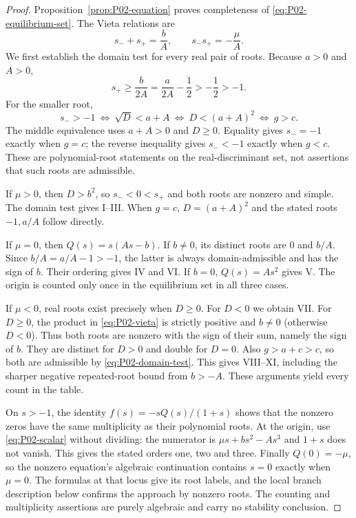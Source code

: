 \begin{proof}
Proposition~\ref{prop:P02-equation} proves completeness of
\eqref{eq:P02-equilibrium-set}. The Vieta relations are
\begin{equation}
\label{eq:P02-vieta}
 s_-+s_+=\frac bA,\qquad s_-s_+=-\frac\mu A.
\end{equation}
We first establish the domain test for every real pair of roots.
Because $a>0$ and $A>0$,
\[
 s_+\ge\frac b{2A}=\frac a{2A}-\frac12>-\frac12>-1.
\]
For the smaller root,
\begin{equation}
\label{eq:P02-domain-test}
 s_->-1
 \ \Longleftrightarrow\ \sqrt D<a+A
 \ \Longleftrightarrow\ D<(a+A)^2
 \ \Longleftrightarrow\ g>c.
\end{equation}
The middle equivalence uses $a+A>0$ and $D\ge0$. Equality gives
$s_-=-1$ exactly when $g=c$; the reverse inequality gives $s_-<-1$
exactly when $g<c$. These are polynomial-root statements on the
real-discriminant set, not assertions that such roots are admissible.

If $\mu>0$, then $D>b^2$, so $s_-<0<s_+$ and both roots are
nonzero and simple. The domain test gives I--III. When $g=c$,
$D=(a+A)^2$ and the stated roots $-1,a/A$ follow directly.

If $\mu=0$, then $Q(s)=s(As-b)$. If $b\ne0$, its distinct roots
are $0$ and $b/A$. Since $b/A=a/A-1>-1$, the latter is always
domain-admissible and has the sign of $b$. Their ordering gives
IV and VI. If $b=0$, $Q(s)=As^2$ gives V. The origin is counted
only once in the equilibrium set in all three cases.

If $\mu<0$, real roots exist precisely when $D\ge0$. For $D<0$
we obtain VII. For $D\ge0$, the product in \eqref{eq:P02-vieta}
is strictly positive and $b\ne0$ (otherwise $D<0$). Thus both
roots are nonzero with the sign of their sum, namely the sign of $b$.
They are distinct for $D>0$ and double for $D=0$. Also
$g>a+c>c$, so both are admissible by \eqref{eq:P02-domain-test}.
This gives VIII--XI, including the sharper negative repeated-root
bound from $b>-A$. These arguments yield every count in the table.

On $s>-1$, the identity $f(s)=-sQ(s)/(1+s)$ shows that the
nonzero zeros have the same multiplicity as their polynomial roots.
At the origin, use \eqref{eq:P02-scalar} without dividing:
the numerator is $\mu s+bs^2-As^3$ and $1+s$ does not vanish.
This gives the stated orders one, two and three. Finally $Q(0)=-\mu$,
so the nonzero equation's algebraic continuation contains $s=0$
exactly when $\mu=0$. The formulas at that locus give its root
labels, and the local branch description below confirms the approach
by nonzero roots. The counting and multiplicity assertions are purely
algebraic and carry no stability conclusion.
\end{proof}


